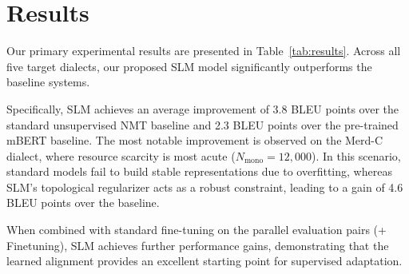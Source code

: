\section{Results}
Our primary experimental results are presented in Table~\ref{tab:results}. Across all five target dialects, our proposed SLM model significantly outperforms the baseline systems. 

Specifically, SLM achieves an average improvement of 3.8 BLEU points over the standard unsupervised NMT baseline and 2.3 BLEU points over the pre-trained mBERT baseline. The most notable improvement is observed on the Merd-C dialect, where resource scarcity is most acute ($N_{\text{mono}} = 12,000$). In this scenario, standard models fail to build stable representations due to overfitting, whereas SLM's topological regularizer acts as a robust constraint, leading to a gain of 4.6 BLEU points over the baseline.

When combined with standard fine-tuning on the parallel evaluation pairs (+ Finetuning), SLM achieves further performance gains, demonstrating that the learned alignment provides an excellent starting point for supervised adaptation.
